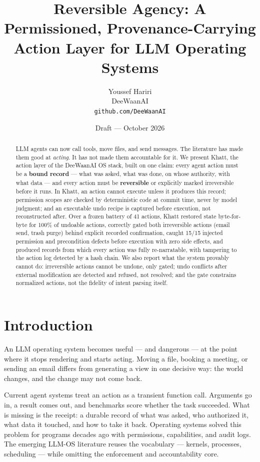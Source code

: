 \documentclass[11pt]{article}
\title{Reversible Agency: A Permissioned, Provenance-Carrying\\
Action Layer for LLM Operating Systems}
\author{Youssef Hariri\\
DeeWaanAI\\
\texttt{github.com/DeeWaanAI}}
\date{Draft --- October 2026}
\newcommand{\sys}{Khatt}
\begin{document}
\maketitle

\begin{abstract}
LLM agents can now call tools, move files, and send messages. The literature has
made them good at \emph{acting}. It has not made them accountable for it. We
present \sys{}, the action layer of the DeeWaanAI OS stack, built on one claim:
every agent action must be a \textbf{bound record} --- what was asked, what was
done, on whose authority, with what data --- and every action must be
\textbf{reversible} or explicitly marked irreversible before it runs. In \sys{},
an action cannot execute unless it produces this record; permission scopes are
checked by deterministic code at commit time, never by model judgment; and an
executable undo recipe is captured before execution, not reconstructed after.
Over a frozen battery of 41 actions, \sys{} restored state byte-for-byte for
100\% of undoable actions, correctly gated both irreversible actions (email send,
trash purge) behind explicit recorded confirmation, caught 15/15 injected
permission and precondition defects before execution with zero side effects, and
produced records
from which every action was fully re-narratable, with tampering to the action log
detected by a hash chain. We also report what the system provably cannot do:
irreversible actions cannot be undone, only gated; undo conflicts after external
modification are detected and refused, not resolved; and the gate constrains
normalized actions, not the fidelity of intent parsing itself.
\end{abstract}

\section{Introduction}

An LLM operating system becomes useful --- and dangerous --- at the point where it
stops rendering and starts acting. Moving a file, booking a meeting, or sending
an email differs from generating a view in one decisive way: the world changes,
and the change may not come back.

Current agent systems treat an action as a transient function call. Arguments go
in, a result comes out, and benchmarks score whether the task succeeded. What is
missing is the receipt: a durable record of what was asked, who authorized it,
what data it touched, and how to take it back. Operating systems solved this
problem for programs decades ago with permissions, capabilities, and audit logs.
The emerging LLM-OS literature reuses the vocabulary --- kernels, processes,
scheduling --- while omitting the enforcement and accountability core.
\end{document}
